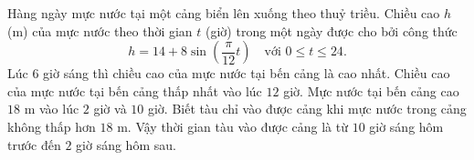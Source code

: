 \begin{ex}
Hàng ngày mực nước tại một cảng biển lên xuống theo thuỷ triều. Chiều cao $h$ (m) của mực nước theo thời gian $t$ (giờ) trong một ngày được cho bởi công thức
\[h=14+8\sin\left(\dfrac{\pi}{12}t\right)\quad\text{với }0\le t\le24.\]
\choiceTF
{\True Lúc $6$ giờ sáng thì chiều cao của mực nước tại bến cảng là cao nhất.}
{Chiều cao của mực nước tại bến cảng thấp nhất vào lúc $12$ giờ.}
{\True Mực nước tại bến cảng cao $18$ m vào lúc $2$ giờ và $10$ giờ.}
{Biết tàu chỉ vào được cảng khi mực nước trong cảng không thấp hơn $18$ m. Vậy thời gian tàu vào được cảng là từ $10$ giờ sáng hôm trước đến $2$ giờ sáng hôm sau.}
\end{ex}
